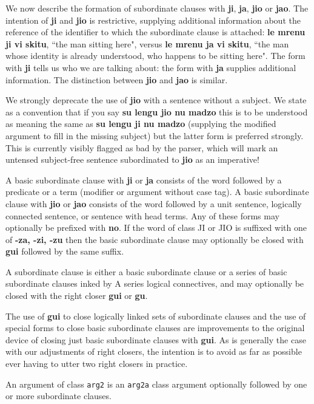 \documentclass[12pt]{book}
\begin{document}
We now describe the formation of subordinate clauses with {\bf ji}, {\bf ja}, {\bf jio} or {\bf jao}.  The intention of {\bf ji} and {\bf jio} is restrictive, supplying additional information about the reference of the identifier to which the subordinate clause is attached:  {\bf le mrenu ji vi skitu}, ``the man sitting here",
versus {\bf le mrenu ja vi skitu}, ``the man whose identity is already understood, who happens to be sitting here".  The form with {\bf ji} tells us who we are talking about:  the form with {\bf ja} supplies additional information.  The distinction between {\bf jio} and {\bf jao} is similar.

We strongly deprecate the use of {\bf jio} with a sentence without a subject.  We state as a convention that
if you say {\bf su lengu jio nu madzo} this is to be understood as meaning the same as {\bf su lengu ji nu madzo} (supplying the modified argument to fill in the missing subject) but the latter form is preferred strongly.  This is currently visibly flagged as bad by the parser, which will mark an untensed subject-free sentence subordinated to {\bf jio} as an imperative!

A basic subordinate clause with {\bf ji} or {\bf ja} consists of the word followed by a predicate or a term (modifier or argument without case tag).   A basic subordinate clause with {\bf jio} or {\bf jao} consists of the word followed by a unit sentence, logically connected sentence, or sentence with head terms.  Any of these forms may optionally be prefixed with {\bf no}.  If the word of class JI or JIO is suffixed with one of {\bf -za, -zi, -zu}
then the basic subordinate clause may optionally be closed with {\bf gui} followed by the same suffix.

A subordinate clause is either a basic subordinate clause or a series of basic subordinate clauses inked by A series logical connectives, and may optionally be closed with the right closer {\bf gui} or {\bf gu}.  

The use of {\bf gui} to close logically linked sets of subordinate clauses and the use of special forms to close basic subordinate clauses are improvements to the original device of closing just basic subordinate clauses with {\bf gui}.  As is generally the case with our adjustments of right closers, the intention is to avoid as far as possible ever having to utter two right closers in practice.

An argument of class {\tt arg2} is an {\tt arg2a} class argument optionally followed by one or more subordinate clauses.
\end{document}
